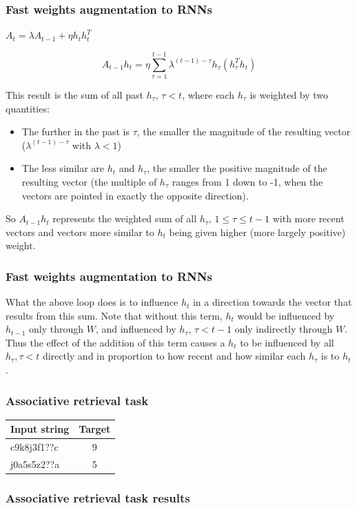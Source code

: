 \documentclass{beamer}
\begin{document}
\begin{frame}
  \frametitle{Fast weights augmentation to RNNs}
    $A_t = \lambda A_{t-1} + \eta h_t h_t^T$

    \begin{equation*}
A_{t-1} h_t = \eta \sum_{\tau=1}^{t-1} \lambda^{(t-1) - \tau} h_\tau \left(h_\tau^T h_t\right)
    \end{equation*}

This result is the sum of all past $h_\tau,\, \tau < t$, where each $h_\tau$ is weighted by two quantities:

\begin{itemize}
\item The further in the past is $\tau$, the smaller the magnitude of the resulting vector ($\lambda^{(t-1) - \tau}$ with $\lambda < 1$)
\item The less similar are $h_t$ and $h_\tau$, the smaller the positive magnitude of the resulting vector (the multiple of $h_\tau$ ranges from 1 down to -1, when the vectors are pointed in exactly the opposite direction).
\end{itemize}
%
So $A_{t-1} h_t$ represents the weighted sum of all $h_\tau,\, 1 \leq \tau \leq t-1$ with more recent vectors and vectors more similar to $h_t$ being given higher (more largely positive) weight.
\end{frame}

\begin{frame}
  \frametitle{Fast weights augmentation to RNNs}
  What the above loop does is to influence $h_t$ in a direction towards the vector that results from this sum. Note that without this term, $h_t$ would be influenced by $h_{t-1}$ only through $W$, and influenced by $h_\tau,\, \tau < t-1$ only indirectly through $W$. Thus the effect of the addition of this term causes a $h_t$ to be influenced by all $h_\tau, \tau < t$ directly and in proportion to how recent and how similar each $h_\tau$ is to $h_t$.
\end{frame}

\begin{frame}
  \frametitle{Associative retrieval task}
  \begin{center}
    \begin{tabular}{lc}
      Input string & Target \\
      \hline
      c9k8j3f1??c & 9 \\
      j0a5s5z2??a & 5 \\
    \end{tabular}
  \end{center}
\end{frame}

\begin{frame}
  \frametitle{Associative retrieval task results}

\end{frame}

\end{document}
